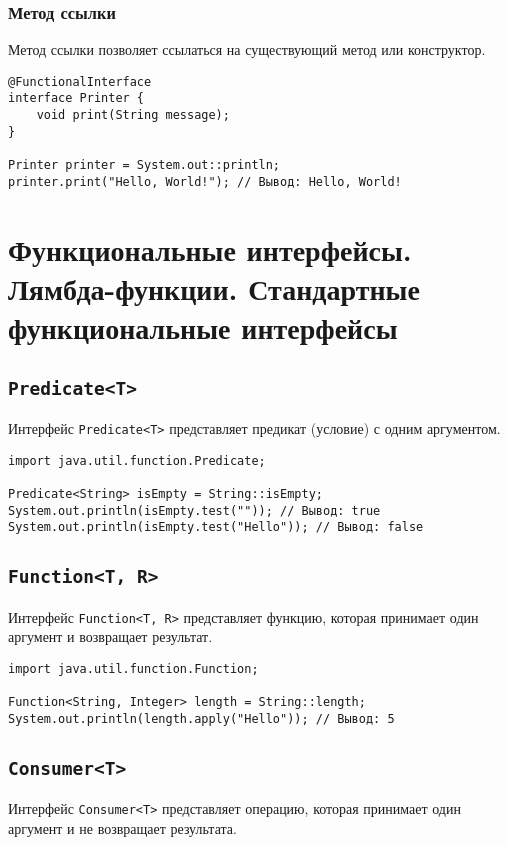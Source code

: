 \documentclass[12pt, a4paper]{article}
\begin{document}
\subsubsection*{Метод ссылки}
Метод ссылки позволяет ссылаться на существующий метод или конструктор.

\begin{verbatim}
@FunctionalInterface
interface Printer {
    void print(String message);
}

Printer printer = System.out::println;
printer.print("Hello, World!"); // Вывод: Hello, World!
\end{verbatim}



\section{Функциональные интерфейсы. Лямбда-функции. Стандартные функциональные интерфейсы}
\subsection*{\texttt{Predicate<T>}}
Интерфейс \texttt{Predicate<T>} представляет предикат (условие) с одним аргументом.

\begin{verbatim}
import java.util.function.Predicate;

Predicate<String> isEmpty = String::isEmpty;
System.out.println(isEmpty.test("")); // Вывод: true
System.out.println(isEmpty.test("Hello")); // Вывод: false
\end{verbatim}

\subsection*{\texttt{Function<T, R>}}
Интерфейс \texttt{Function<T, R>} представляет функцию, которая принимает один аргумент и возвращает результат.

\begin{verbatim}
import java.util.function.Function;

Function<String, Integer> length = String::length;
System.out.println(length.apply("Hello")); // Вывод: 5
\end{verbatim}

\subsection*{\texttt{Consumer<T>}}
Интерфейс \texttt{Consumer<T>} представляет операцию, которая принимает один аргумент и не возвращает результата.
\end{document}

